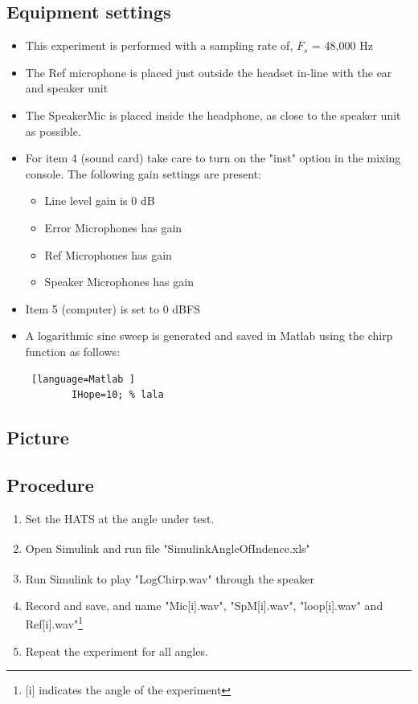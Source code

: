 \subsection{Equipment settings}
\begin{itemize}
	\item This experiment is performed with a sampling rate of, $F_{s}$ = 48,000 Hz
	\item The Ref microphone is placed just outside the headset in-line with the ear and speaker unit
	\item The SpeakerMic is placed inside the headphone, as close to the speaker unit as possible. 
	\item For item 4 (sound card) take care to turn on the "inst" option in the mixing console. The following gain settings are present: 		
	\begin{itemize}
		\item Line level gain is 0 dB
		\item Error Microphones has gain
		\item Ref Microphones has gain
		\item Speaker Microphones has gain
	\end{itemize}
	\item Item 5 (computer) is set to 0 dBFS
	\item A logarithmic sine sweep is generated and saved in Matlab using the chirp function as follows:
	\begin{lstlisting} [language=Matlab	]
		IHope=10; % lala
	\end{lstlisting}
\end{itemize}

\subsection{Picture}



\subsection{Procedure}
\begin{enumerate}
	\item Set the HATS at the angle under test. 
	\item Open Simulink\textsuperscript{\textregistered} and run file "SimulinkAngleOfIndence.xls"
	\item Run Simulink\textsuperscript{\textregistered} to play "LogChirp.wav" through the speaker
	\item Record and save, and name "Mic[i].wav", "SpM[i].wav", "loop[i].wav" and Ref[i].wav"\footnote{[i] indicates the angle of the experiment}
	\item Repeat the experiment for all angles.

\end{enumerate}

